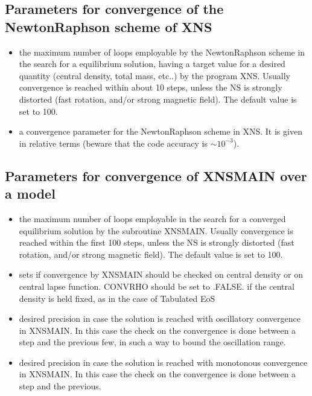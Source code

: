 \documentclass[letterpaper,10pt,english]{sphinxmanual}
\begin{document}
\subsection{Parameters for convergence of the Newton\sphinxhyphen{}Raphson scheme of XNS}
\label{\detokenize{user_params:parameters-for-convergence-of-the-newton-raphson-scheme-of-xns}}\begin{itemize}
\item {} 
\sphinxAtStartPar
{} \sphinxhyphen{} the maximum number of loops employable by the Newton\sphinxhyphen{}Raphson scheme in the search
for a equilibrium solution, having a target value for a desired quantity (central density, total mass,
etc..) by the program XNS. Usually convergence is reached within about 10 steps, unless the NS is
strongly distorted (fast rotation, and/or strong magnetic field). The default value is set to 100.


\item {} 
\sphinxAtStartPar
{} \sphinxhyphen{} a convergence parameter for the Newton\sphinxhyphen{}Raphson scheme in XNS. It is given in relative terms
(beware that the code accuracy is \(\sim 10^{-3}\)).


\end{itemize}


\subsection{Parameters for convergence of XNSMAIN over a model}
\label{\detokenize{user_params:parameters-for-convergence-of-xnsmain-over-a-model}}\begin{itemize}
\item {} 
\sphinxAtStartPar
{} \sphinxhyphen{} the maximum number of loops employable in the search for a converged equilibrium
solution by the subroutine XNSMAIN. Usually convergence is reached within the first 100 steps,
unless the NS is strongly distorted (fast rotation, and/or strong magnetic field). The default value is
set to 100.


\item {} 
\sphinxAtStartPar
{} \sphinxhyphen{} sets if convergence by XNSMAIN should be checked on central density or on central lapse function. CONVRHO should be set to .FALSE. if the central density is held fixed, as in the case of Tabulated EoS


\item {} 
\sphinxAtStartPar
{} \sphinxhyphen{} desired precision in case the solution is reached with oscillatory convergence in XNSMAIN. In this case the check on the convergence is done between a step and the previous few, in such a way to bound the oscillation range.


\item {} 
\sphinxAtStartPar
{} \sphinxhyphen{} desired precision in case the solution is reached with monotonous convergence in XNSMAIN. In this case the check on the convergence is done between a step and the previous.


\end{itemize}
\end{document}
